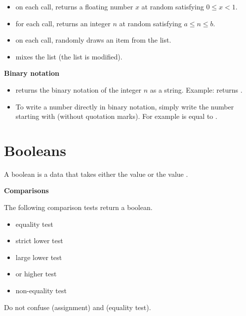 \documentclass[11pt,class=report,crop=false]{standalone}
\begin{document}
\begin{itemize}
  \item {}\quad on each call, returns a floating number $x$ at random satisfying $0 \le x < 1$.
  \item {} \quad for each call, returns an integer $n$ at random satisfying $a \le n \le b$.
  \item {} \quad on each call, randomly draws an item from the list.
  \item {} \quad mixes the list (the list is modified).
 \end{itemize}

\bigskip

\textbf{Binary notation}

\begin{itemize}
  \item {}\quad returns the binary notation of the integer $n$ as a string. 
  Example:  returns .
  
  \item To write a number directly in binary notation, simply write the number starting with  (without quotation marks). For example  is equal to .
 \end{itemize}




\section{Booleans}

A boolean is a data that takes either the value  or the value .

  
\bigskip

\textbf{Comparisons}
 
The following comparison tests return a boolean.
  \begin{itemize}
    \item {} \quad equality test
    	\item {} \quad strict lower test
    	\item {} \quad large lower test
    	\item {} \quad or \quad {}\quad higher test
    	\item {} \quad non-equality test
  \end{itemize}
  
 Do not confuse \og{}\fg{} (assignment) and \og{}\fg{} (equality test).
  
\end{document}

